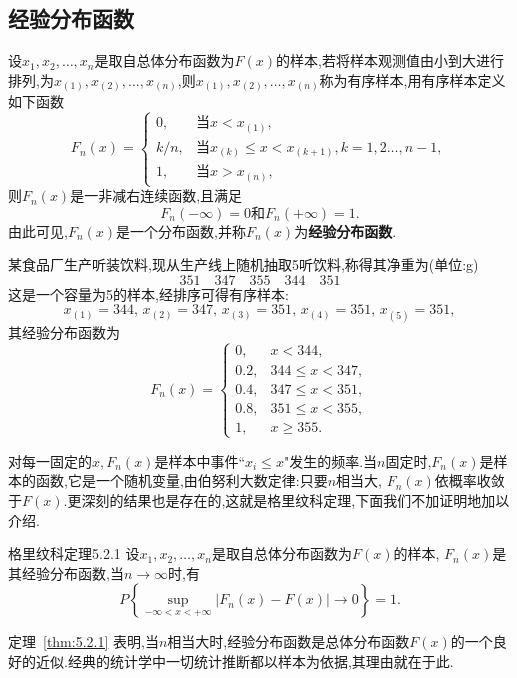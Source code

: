 \subsection{经验分布函数\label{ssec:5.2.1}}
设$x_1,x_2,\dotsc,x_n$是取自总体分布函数为$F(x)$的样本,若将样本观测值由小到大进行排列,为$x_{(1)},x_{(2)},\dotsc,x_{(n)}$,则$x_ {(1)},x_{(2)},\dotsc,x_{(n)}$称为有序样本,用有序样本定义如下函数
\begin{equation}\label{eq5.2.1}
F_n(x)=\begin{cases}
0,&\text{当}x<x_{(1)},\\
k/n,&\text{当}x_{(k)}\leq x<x_{(k+1)},k=1,2\dotsc,n-1,\\
1,&\text{当}x>x_{(n)},
\end{cases}
\end{equation}
则$F_n(x)$是一非减右连续函数,且满足
\[F_n(-\infty)=0\text{和}F_n(+\infty)=1.\]
由此可见,$F_n(x)$是一个分布函数,并称$F_n(x)$为\textbf{经验分布函数}.
\begin{example}
某食品厂生产听装饮料,现从生产线上随机抽取5听饮料,称得其净重为(单位:\si{g})
\[351\quad347\quad355\quad344\quad351\]
这是一个容量为5的样本,经排序可得有序样本:
\[x_{(1)}=344,\,x_{(2)}=347,\,x_{(3)}=351,\,x_{(4)}=351,\,x_{(5)}=351,\]
其经验分布函数为
\[F_n(x)=\begin{cases}
0,&x<344,\\
0.2,&344\leq x<347,\\
0.4,&347\le x<351,\\
0.8,&351\le x<355,\\
1,&x\geq355.
\end{cases}\]
\end{example}

对每一固定的$x,F_n(x)$是样本中事件``$x_i\leq x$"发生的频率.当$n$固定时,$F_n(x)$是样本的函数,它是一个随机变量,由伯努利大数定律:只要$n$相当大, $F_n(x)$依概率收敛于$F(x)$.更深刻的结果也是存在的,这就是格里纹科定理,下面我们不加证明地加以介绍.
\begin{theorem}{格里纹科定理}{5.2.1}
设$x_1,x_2,\dotsc,x_n$是取自总体分布函数为$F(x)$的样本, $F_n(x)$是其经验分布函数,当$n\to\infty$时,有
\[P\left\{\sup_{-\infty<x<+\infty}|F_n(x)-F(x)|\to0\right\}=1.\]
\end{theorem}

定理~\ref{thm:5.2.1} 表明,当$n$相当大时,经验分布函数是总体分布函数$F(x)$的一个良好的近似.经典的统计学中一切统计推断都以样本为依据,其理由就在于此.
